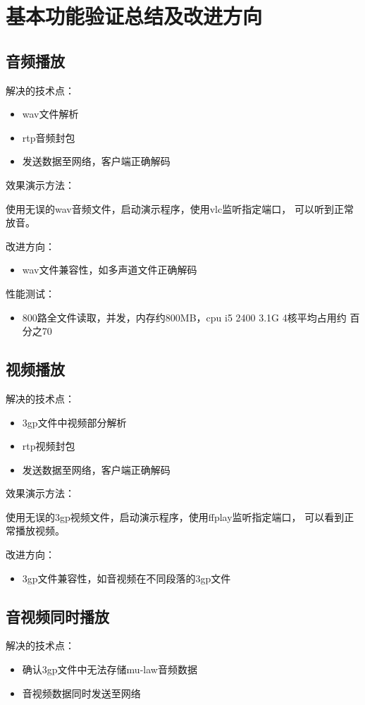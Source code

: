 \documentclass[11pt]{article}
\begin{document}
\section{基本功能验证总结及改进方向}
\subsection{音频播放}
    解决的技术点：
    \begin{itemize}
        \item wav文件解析
        \item rtp音频封包
        \item 发送数据至网络，客户端正确解码
    \end{itemize}

    效果演示方法：
        
        使用无误的wav音频文件，启动演示程序，使用vlc监听指定端口，
        可以听到正常放音。

    改进方向：
    \begin{itemize}
        \item wav文件兼容性，如多声道文件正确解码
    \end{itemize}

    性能测试：
    \begin{itemize}
        \item 800路全文件读取，并发，内存约800MB，cpu i5 2400 3.1G 4核平均占用约
              百分之70
    \end{itemize}
\subsection{视频播放}
    解决的技术点：
    \begin{itemize}
        \item 3gp文件中视频部分解析
        \item rtp视频封包
        \item 发送数据至网络，客户端正确解码
    \end{itemize}

    效果演示方法：
        
        使用无误的3gp视频文件，启动演示程序，使用ffplay监听指定端口，
        可以看到正常播放视频。

    改进方向：
    \begin{itemize}
        \item 3gp文件兼容性，如音视频在不同段落的3gp文件
    \end{itemize}
\subsection{音视频同时播放}
    解决的技术点：
    \begin{itemize}
        \item 确认3gp文件中无法存储mu-law音频数据
        \item 音视频数据同时发送至网络
    \end{itemize}
\end{document}
